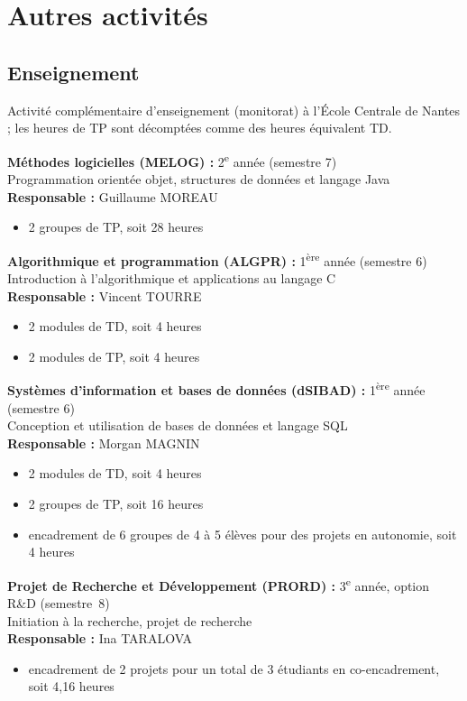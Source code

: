 \chapter{Autres activités}

\section{Enseignement}

Activité complémentaire d'enseignement (monitorat) à l'École Centrale de Nantes ; les heures de TP sont décomptées comme des heures équivalent TD.

\bigskip

\noindent
\textbf{Méthodes logicielles (MELOG) :} 2\textsuperscript{e} année (semestre 7)\\
Programmation orientée objet, structures de données et langage Java\\
\textbf{Responsable :} Guillaume MOREAU
\begin{itemize}
  \item 2 groupes de TP, soit 28 heures
\end{itemize}

\bigskip\noindent
\textbf{Algorithmique et programmation (ALGPR) :} 1\textsuperscript{ère} année (semestre 6)\\
Introduction à l'algorithmique et applications au langage C\\
\textbf{Responsable :} Vincent TOURRE
\begin{itemize}
  \item 2 modules de TD, soit 4 heures
  \item 2 modules de TP, soit 4 heures
\end{itemize}

\bigskip\noindent
\textbf{Systèmes d'information et bases de données (dSIBAD) :} 1\textsuperscript{ère} année (semestre 6)\\
Conception et utilisation de bases de données et langage SQL\\
\textbf{Responsable :} Morgan MAGNIN
\begin{itemize}
  \item 2 modules de TD, soit 4 heures
  \item 2 groupes de TP, soit 16 heures
  \item encadrement de 6 groupes de 4 à 5 élèves pour des projets en autonomie, soit 4 heures
\end{itemize}

\bigskip\noindent
\textbf{Projet de Recherche et Développement (PRORD) :} 3\textsuperscript{e} année, option R\&D (semestre~8)\\
Initiation à la recherche, projet de recherche\\
\textbf{Responsable :} Ina TARALOVA
\begin{itemize}
  \item encadrement de 2 projets pour un total de 3 étudiants en co-encadrement, soit 4,16 heures
\end{itemize}

